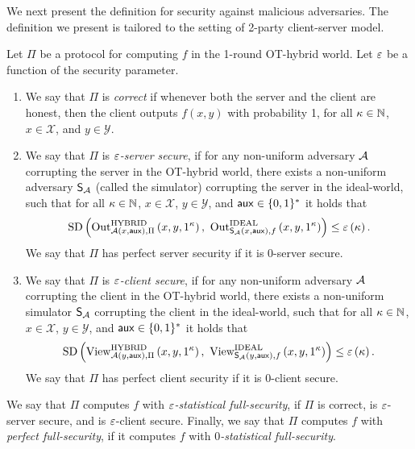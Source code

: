 \documentclass{llncs}
\newcommand{\X}{\mathcal{X}}
\newcommand{\Y}{\mathcal{Y}}
\newcommand{\aux}{\mathsf{aux}}
\newcommand{\HYBRID}{\operatorname{HYBRID}}
\newcommand{\IDEAL}{\operatorname{IDEAL}}
\newcommand{\Out}{\operatorname{Out}}
\newcommand{\View}{\operatorname{View}}
\renewcommand{\SD}{\operatorname*{SD}}
\begin{document}
We next present the definition for security against malicious adversaries. The definition we present is tailored to the setting of 2-party client-server model.
\begin{definition}\label{def:perfectsec}
	Let $\Pi$ be a protocol for computing $f$ in the 1-round OT-hybrid world. Let $\varepsilon$ be a function of the security parameter.
    \begin{enumerate}
    \item\label{item:corr} We say that $\Pi$ is \emph{correct} if whenever both the server and the client are honest, then the client outputs $f(x,y)$ with probability 1, for all $\kappa\in{\mathbb{N}}$, $x\in\X$, and $y\in\Y$.
    
    \item\label{item:malser} We say that $\Pi$ is \emph{$\varepsilon$-server secure}, if for any non-uniform adversary $\mathcal{A}$ corrupting the server in the OT-hybrid world, there exists a non-uniform adversary $\mathsf{S}_{\mathcal{A}}$ (called the simulator) corrupting the server in the ideal-world, such that for all $\kappa\in{\mathbb{N}}$, $x\in\X$, $y\in\Y$, and $\aux\in\zo^*$ it holds that $$\SD\of{\Out^{\HYBRID}_{\adv\of{x,\aux},\Pi}\of{x,y,1^{\kappa}},~\Out^{\IDEAL}_{\Sim_{\adv}\of{x,\aux},f}\of{x,y,1^{\kappa}}}\leq\eps\of{\kappa}.$$
    We say that $\Pi$ has perfect server security if it is 0-server secure.
    
    \item\label{item:malcl} We say that $\Pi$ is \emph{$\varepsilon$-client secure}, if for any non-uniform adversary $\mathcal{A}$ corrupting the client in the OT-hybrid world, there exists a non-uniform simulator $\mathsf{S}_{\mathcal{A}}$ corrupting the client in the ideal-world, such that for all $\kappa\in{\mathbb{N}}$, $x\in\X$, $y\in\Y$, and $\aux\in\zo^*$ it holds that$$\SD\of{\View^{\HYBRID}_{\adv\of{y,\aux},\Pi}\of{x,y,1^{\kappa}},~\View^{\IDEAL}_{\Sim_{\adv}\of{y,\aux},f}\of{x,y,1^{\kappa}}}\leq\eps\of{\kappa}.$$
     We say that $\Pi$ has perfect client security if it is 0-client secure.
    \end{enumerate}
    
     We say that $\Pi$ computes $f$ with \emph{$\varepsilon$-statistical full-security}, if $\Pi$ is correct, is $\varepsilon$-server secure, and is $\varepsilon$-client secure. Finally, we say that $\Pi$ computes $f$ with \emph{perfect full-security}, if it computes $f$ with \emph{$0$-statistical full-security}.
\end{definition}
\end{document}
